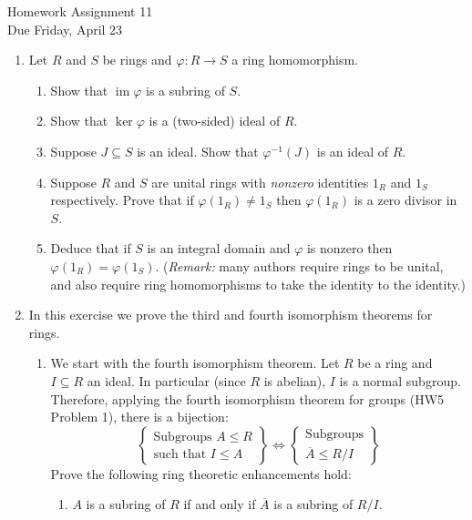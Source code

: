 \documentclass[11pt]{article}
\newcommand{\im}{\operatorname{im}}
\begin{document}
\begin{center}
  \Large {Homework Assignment 11}\\
  \small {Due Friday, April 23}
\end{center}
\begin{enumerate}
  \item{
  Let $R$ and $S$ be rings and $\varphi:R\to S$ a ring homomorphism.
  \begin{enumerate}
    \item{Show that $\im\varphi$ is a subring of $S$.}
    \item{Show that $\ker\varphi$ is a (two-sided) ideal of $R$.}
    \item{Suppose $J\subseteq S$ is an ideal.  Show that $\varphi^{-1}(J)$ is an ideal of $R$.}
    \item{Suppose $R$ and $S$ are unital rings with \textit{nonzero} identities $1_R$ and $1_S$ respectively.  Prove that if $\varphi(1_R)\not=1_S$ then $\varphi(1_R)$ is a zero divisor in $S$.}
    \item{Deduce that if $S$ is an integral domain and $\varphi$ is nonzero then $\varphi(1_R)=\varphi(1_S)$.  (\textit{Remark:} many authors require rings to be unital, and also require ring homomorphisms to take the identity to the identity.)}
  \end{enumerate}
  }
  \item{
  In this exercise we prove the third and fourth isomorphism theorems for rings.
  \begin{enumerate}
    \item{We start with the fourth isomorphism theorem.  Let $R$ be a ring and $I\subseteq R$ an ideal.  In particular (since $R$ is abelian), $I$ is a normal subgroup.  Therefore, applying the fourth isomorphism theorem for groups (HW5 Problem 1), there is a bijection:
    \[\left\{
    \begin{array}{c}
      \text{Subgroups }A\le R\\
      \text{such that }I\le A
    \end{array}\right\}
    \Longleftrightarrow
    \left\{
    \begin{array}{c}
      \text{Subgroups}\\
      \overline{A}\le R/I
    \end{array}
    \right\}
    \]
    Prove the following ring theoretic enhancements hold:
    \begin{enumerate}
      \item{$A$ is a subring of $R$ if and only if $\overline A$ is a subring of $R/I$.}

\end{enumerate}}
\end{enumerate}}
\end{enumerate}
\end{document}
